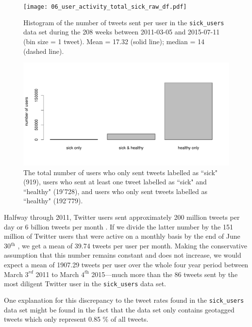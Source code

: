 \documentclass[11pt, a4paper,twoside]{report}\usepackage[]{graphicx}\usepackage[]{color}
\begin{document}
\begin{figure}[H]
  \centering
    \texttt{[image: 06\_user\_activity\_total\_sick\_raw\_df.pdf]}
  \caption{Histogram of the number of tweets sent per user in the \texttt{sick\_users} data set during the 208 weeks between 2011-03-05 and 2015-07-11 (bin size = 1 tweet). Mean = 17.32 (solid line); median = 14 (dashed line).}
  \label{fig:histogram_ID_tot}
\end{figure}

\hfill

\begin{figure}[H]
\centering
\includegraphics[width=1\linewidth]{07_barplot_sick_raw_df.pdf}
\caption{The total number of users who only sent tweets labelled as ``sick" (919), users who sent at least one tweet labelled as ``sick" and ``healthy" (19'728), and users who only sent tweets labelled as ``healthy" (192'779).}
\label{fig:barplot_sick_df}
\end{figure}

Halfway through 2011, Twitter users sent approximately 200 million tweets per day or 6 billion tweets per month \citep{twitter_million_2011}. If we divide the latter number by the 151 million of Twitter users that were active on a monthly basis by the end of June 30$^\textit{th}$ \citep{twitter_annual_2013}, we get a mean of 39.74 tweets per user per month. Making the conservative assumption that this number remains constant and does not increase, we would expect a mean of 1907.29 tweets per user over the whole four year period between March $3^\textit{rd}$ 2011 to March $4^\textit{th}$ 2015---much more than the 86 tweets sent by the most diligent Twitter user in the \texttt{sick\_users} data set.

One explanation for this discrepancy to the tweet rates found in the \texttt{sick\_users} data set might be found in the fact that the data set only contains geotagged tweets which only represent 0.85 \% \citep{sloan2013knowing} of all tweets. 
\end{document}
